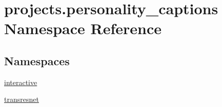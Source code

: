 \hypertarget{namespaceprojects_1_1personality__captions}{}\section{projects.\+personality\+\_\+captions Namespace Reference}
\label{namespaceprojects_1_1personality__captions}
\subsection*{Namespaces}
\begin{DoxyCompactItemize}
\item 
 \hyperlink{namespaceprojects_1_1personality__captions_1_1interactive}{interactive}
\item 
 \hyperlink{namespaceprojects_1_1personality__captions_1_1transresnet}{transresnet}
\end{DoxyCompactItemize}
